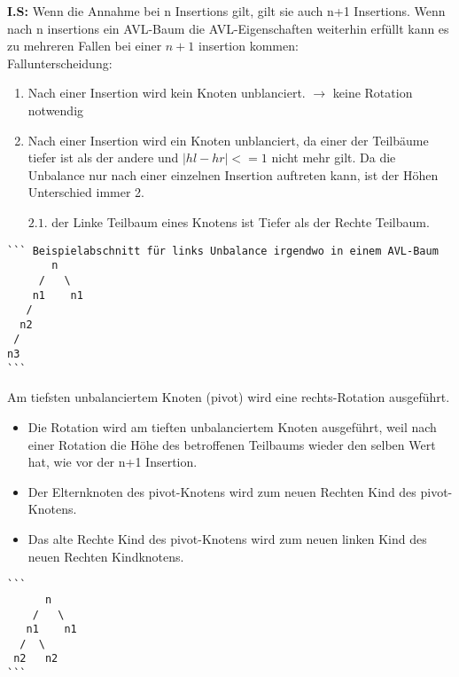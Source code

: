 \textbf{I.S:} Wenn die Annahme bei n Insertions gilt, gilt sie auch n+1 Insertions. Wenn nach n insertions ein AVL-Baum die AVL-Eigenschaften weiterhin erfüllt kann es zu mehreren Fallen bei einer $n+1$ insertion kommen:\\
Fallunterscheidung:
\begin{enumerate}
	\item Nach einer Insertion wird kein Knoten unblanciert. $\rightarrow$ keine Rotation notwendig
	\item Nach einer Insertion wird ein Knoten unblanciert, da einer der Teilbäume tiefer ist als der andere und $|hl - hr| <= 1$  nicht mehr gilt.
Da die Unbalance nur nach einer einzelnen Insertion auftreten kann, ist der Höhen Unterschied immer 2.
	\item[$2.1.$] der Linke Teilbaum eines Knotens ist Tiefer als der Rechte Teilbaum.
\end{enumerate}

\begin{verbatim}
``` Beispielabschnitt für links Unbalance irgendwo in einem AVL-Baum
       n
     /   \
    n1    n1
   /
  n2
 /
n3
```
\end{verbatim}

Am tiefsten unbalanciertem Knoten (pivot) wird eine rechts-Rotation ausgeführt.
\begin{itemize}
	\item Die Rotation wird am tieften unbalanciertem Knoten ausgeführt, weil nach einer Rotation die Höhe des betroffenen Teilbaums wieder den selben Wert hat, wie vor der n+1 Insertion.
	\item Der Elternknoten des pivot-Knotens wird zum neuen Rechten Kind des pivot-Knotens.
	\item Das alte Rechte Kind des pivot-Knotens wird zum neuen linken Kind des neuen Rechten Kindknotens.
\end{itemize}

\begin{verbatim}
```
      n
    /   \
   n1    n1
  /  \
 n2   n2
```
\end{verbatim}

